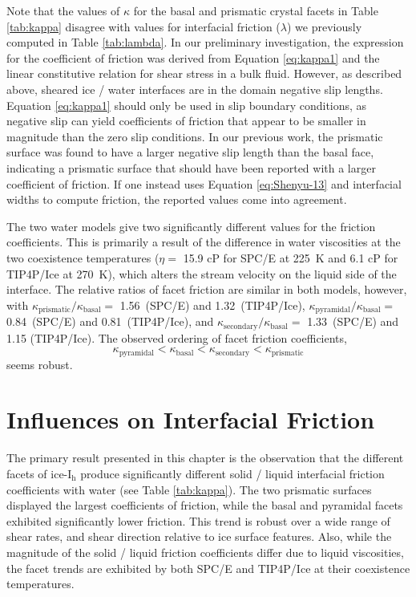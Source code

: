 Note that the values of $\kappa$ for the basal and prismatic crystal
facets in Table \ref{tab:kappa} disagree with values for interfacial
friction ($\lambda$) we previously computed in Table
\ref{tab:lambda}. In our preliminary investigation, the expression for
the coefficient of friction was derived from Equation
\eqref{eq:kappa1} and the linear constitutive relation for shear
stress in a bulk fluid.  However, as described above, sheared ice /
water interfaces are in the domain negative slip lengths. Equation
\eqref{eq:kappa1} should only be used in slip boundary conditions, as
negative slip can yield coefficients of friction that appear to be
smaller in magnitude than the zero slip conditions. In our previous
work, the prismatic surface was found to have a larger negative slip
length than the basal face, indicating a prismatic surface that should
have been reported with a larger coefficient of friction. If one
instead uses Equation \eqref{eq:Shenyu-13} and interfacial widths to
compute friction, the reported values come into agreement.

The two water models give two significantly different values for the
friction coefficients. This is primarily a result of the difference in
water viscosities at the two coexistence temperatures ($\eta = $ 15.9
cP for SPC/E at 225~K and 6.1 cP for TIP4P/Ice at 270~K), which alters
the stream velocity on the liquid side of the interface. The relative
ratios of facet friction are similar in both models, however, with
$\kappa_\mathrm{prismatic} / \kappa_\mathrm{basal} =$ 1.56~(SPC/E) and
1.32~(TIP4P/Ice),
$\kappa_\mathrm{pyramidal} / \kappa_\mathrm{basal} =$ 0.84~(SPC/E) and
0.81~(TIP4P/Ice), and
$\kappa_\mathrm{secondary} / \kappa_\mathrm{basal} =$ 1.33~(SPC/E) and
1.15 (TIP4P/Ice). The observed ordering of facet friction
coefficients,
\begin{equation}
\kappa_\mathrm{pyramidal} < \kappa_\mathrm{basal} <
\kappa_\mathrm{secondary} < \kappa_\mathrm{prismatic} 
\end{equation} 
seems robust.

 
\section{Influences on Interfacial Friction}
The primary result presented in this chapter is the observation that
the different facets of ice-I$_\mathrm{h}$ produce significantly
different solid / liquid interfacial friction coefficients with water
(see Table \ref{tab:kappa}).  The two prismatic surfaces displayed the
largest coefficients of friction, while the basal and pyramidal facets
exhibited significantly lower friction. This trend is robust over a
wide range of shear rates, and shear direction relative to ice surface
features. Also, while the magnitude of the solid / liquid friction
coefficients differ due to liquid viscosities, the facet trends are
exhibited by both SPC/E and TIP4P/Ice at their coexistence
temperatures.

